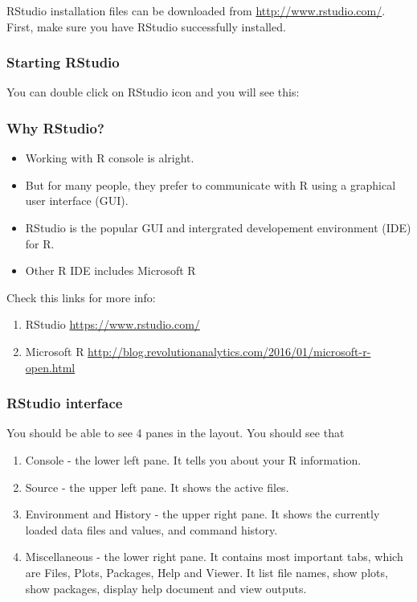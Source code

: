 \documentclass[]{book}
\providecommand{\tightlist}{%
  \setlength{\itemsep}{0pt}\setlength{\parskip}{0pt}}
\theoremstyle{definition}
\theoremstyle{definition}
\theoremstyle{remark}
\begin{document}
RStudio installation files can be downloaded from
\url{http://www.rstudio.com/}. First, make sure you have RStudio
successfully installed.

\subsubsection{Starting RStudio}\label{starting-rstudio}

You can double click on RStudio icon and you will see this:

\subsubsection{Why RStudio?}\label{why-rstudio}

\begin{itemize}
\tightlist
\item
  Working with R console is alright.
\item
  But for many people, they prefer to communicate with R using a
  graphical user interface (GUI).
\item
  RStudio is the popular GUI and intergrated developement environment
  (IDE) for R.
\item
  Other R IDE includes Microsoft R
\end{itemize}

Check this links for more info:

\begin{enumerate}
\def\labelenumi{\arabic{enumi}.}
\tightlist
\item
  RStudio \url{https://www.rstudio.com/}
\item
  Microsoft R
  \url{http://blog.revolutionanalytics.com/2016/01/microsoft-r-open.html}
\end{enumerate}

\subsubsection{RStudio interface}\label{rstudio-interface}

You should be able to see 4 panes in the layout. You should see that

\begin{enumerate}
\def\labelenumi{\arabic{enumi}.}
\tightlist
\item
  Console - the lower left pane. It tells you about your R information.
\item
  Source - the upper left pane. It shows the active files.
\item
  Environment and History - the upper right pane. It shows the currently
  loaded data files and values, and command history.
\item
  Miscellaneous - the lower right pane. It contains most important tabs,
  which are Files, Plots, Packages, Help and Viewer. It list file names,
  show plots, show packages, display help document and view outputs.
\end{enumerate}
\end{document}
